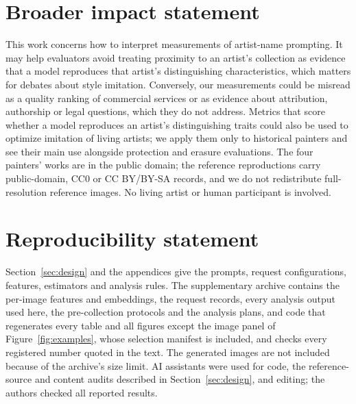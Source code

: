 \documentclass[10pt]{article}
\begin{document}
\section*{Broader impact statement}
This work concerns how to interpret measurements of artist-name prompting. It may help evaluators
avoid treating proximity to an artist's collection as evidence that a model reproduces that artist's
distinguishing characteristics, which matters for debates about style imitation. Conversely, our
measurements could be misread as a quality ranking of commercial services or as evidence about
attribution, authorship or legal questions, which they do not address. Metrics that score whether a
model reproduces an artist's distinguishing traits could also be used to optimize imitation of
living artists; we apply them only to historical painters and see their main use alongside
protection and erasure evaluations. The four painters' works are in the public domain; the reference
reproductions carry public-domain, CC0 or CC BY/BY-SA records, and we do not redistribute
full-resolution reference images. No living artist or human participant is involved.

\section*{Reproducibility statement}
Section~\ref{sec:design} and the appendices give the prompts, request configurations, features,
estimators and analysis rules. The supplementary archive contains the per-image features and
embeddings, the request records, every analysis output used here, the pre-collection protocols and
the analysis plans, and code that regenerates every table and all figures except the image panel of
Figure~\ref{fig:examples}, whose selection manifest is included, and checks every registered number
quoted in the text. The generated images are not included because of the archive's size limit. AI
assistants were used for code, the reference-source and content audits described in
Section~\ref{sec:design}, and editing; the authors checked all reported results.




\clearpage
\appendix

\end{document}
